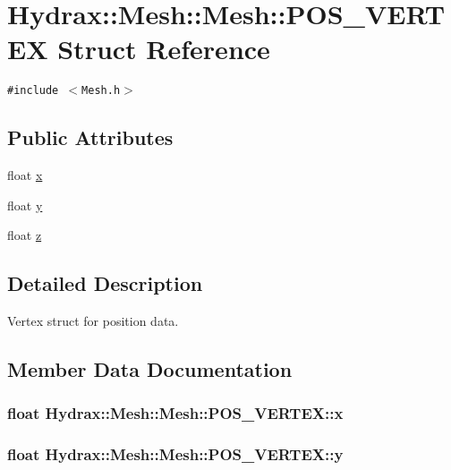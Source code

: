 \hypertarget{struct_hydrax_1_1_mesh_1_1_p_o_s___v_e_r_t_e_x}{
\section{Hydrax::Mesh::Mesh::POS\_\-VERTEX Struct Reference}
\label{struct_hydrax_1_1_mesh_1_1_p_o_s___v_e_r_t_e_x}
}
{\tt \#include $<$Mesh.h$>$}

\subsection*{Public Attributes}
\begin{CompactItemize}
\item 
float \hyperlink{struct_hydrax_1_1_mesh_1_1_p_o_s___v_e_r_t_e_x_fbbd71375208c5877dba33f6ecbe7a3c}{x}
\item 
float \hyperlink{struct_hydrax_1_1_mesh_1_1_p_o_s___v_e_r_t_e_x_4c1e270deeb89d75f15ed61258121e1d}{y}
\item 
float \hyperlink{struct_hydrax_1_1_mesh_1_1_p_o_s___v_e_r_t_e_x_e482c65ad4db2566986f7d29c487d9e4}{z}
\end{CompactItemize}


\subsection{Detailed Description}
Vertex struct for position data. 

\subsection{Member Data Documentation}
\hypertarget{struct_hydrax_1_1_mesh_1_1_p_o_s___v_e_r_t_e_x_fbbd71375208c5877dba33f6ecbe7a3c}{
\subsubsection[{x}]{\setlength{\rightskip}{0pt plus 5cm}float Hydrax::Mesh::Mesh::POS\_\-VERTEX::x}}
\label{struct_hydrax_1_1_mesh_1_1_p_o_s___v_e_r_t_e_x_fbbd71375208c5877dba33f6ecbe7a3c}


\hypertarget{struct_hydrax_1_1_mesh_1_1_p_o_s___v_e_r_t_e_x_4c1e270deeb89d75f15ed61258121e1d}{
\subsubsection[{y}]{\setlength{\rightskip}{0pt plus 5cm}float Hydrax::Mesh::Mesh::POS\_\-VERTEX::y}}
\label{struct_hydrax_1_1_mesh_1_1_p_o_s___v_e_r_t_e_x_4c1e270deeb89d75f15ed61258121e1d}


